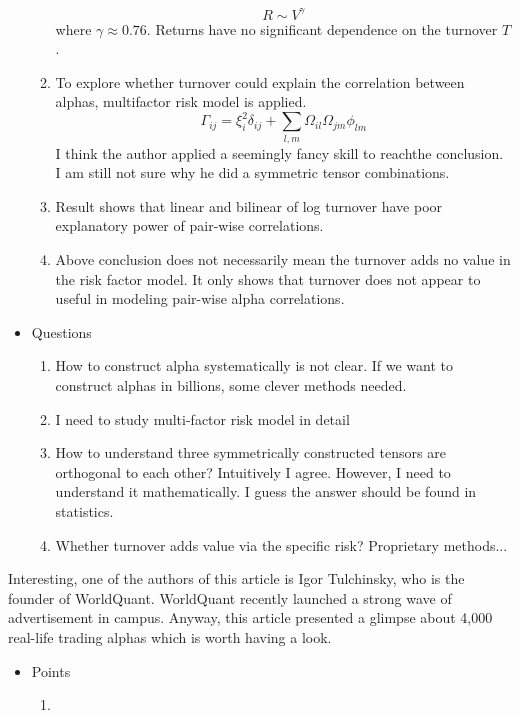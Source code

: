 \documentclass[fontsize=11pt, %
                             paper=a4, %
                             twoside, %
                             captions=tableheading,
                             index=totoc,
                             hyperref]{labbook}
\begin{document}
\begin{addmargin}[4cm]{0cm}
\begin{itemize}
\begin{enumerate}
\begin{equation}
R\sim V^\gamma
\end{equation}
where $\gamma\approx 0.76$. Returns have no significant dependence on the turnover $T$.
\item To explore whether turnover could explain the correlation between alphas, multifactor risk model is applied. 
\begin{equation}
\Gamma_{ij}=\xi_i^2\delta_{ij}+\sum_{l,m}\Omega_{il}\Omega_{jm}\phi_{lm}
\end{equation}
I think the author applied a seemingly fancy skill to reachthe conclusion. I am still not sure why he did a symmetric tensor combinations.
\item
Result shows that linear and bilinear of log turnover have poor explanatory power of pair-wise correlations.
\item
Above conclusion does not necessarily mean the turnover adds no value in the risk factor model. It only shows that turnover does not appear to useful in modeling pair-wise alpha correlations.
\end{enumerate}
\item Questions
\begin{enumerate}
\item 
How to construct alpha systematically is not clear. If we want to construct alphas in billions, some clever methods needed.
\item
I need to study multi-factor risk model in detail
\item
How to understand three symmetrically constructed tensors are orthogonal to each other? Intuitively I agree. However, I need to understand it mathematically. I guess the answer should be found in statistics.
\item
Whether turnover adds value via the specific risk? Proprietary methods...
\end{enumerate}
\end{itemize}
Interesting, one of the authors of this article is Igor Tulchinsky, who is the founder of WorldQuant. WorldQuant recently launched a strong wave of advertisement in campus. Anyway, this article presented a glimpse about 4,000 real-life trading alphas which is worth having a look.
\begin{itemize}
\item Points
\begin{enumerate}
\item

\end{enumerate}
\end{itemize}
\end{addmargin}
\end{document}
